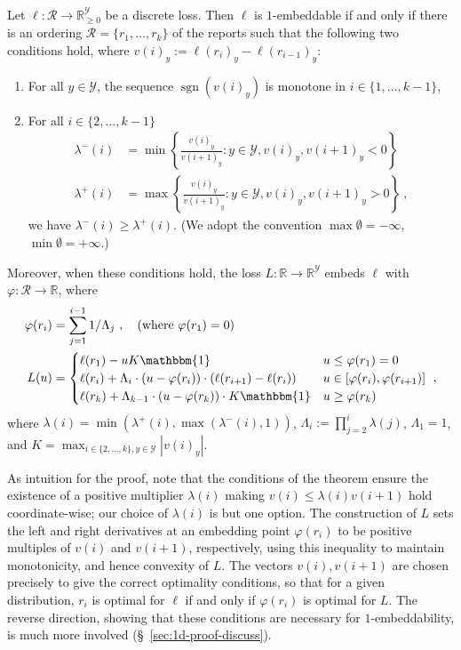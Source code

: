 \documentclass[anon]{colt2020} %
\newcommand{\reals}{\mathbb{R}}
\newcommand{\nonnegreals}{\reals_{\geq 0}}%
\newcommand{\R}{\mathcal{R}}
\newcommand{\Y}{\mathcal{Y}}
\newcommand{\ones}{\mathbbm{1}}
\DeclareMathOperator*{\sgn}{sgn}
\begin{document}
\begin{theorem} \label{thm:construct-1d-loss}
  Let $\ell: \R \to \nonnegreals^{\Y}$ be a discrete loss.
  Then $\ell$ is $1$-embeddable if and only if there is an ordering $\R = \{r_1,\ldots,r_k\}$ of the reports such that the following two conditions hold, where $v(i)_y := \ell(r_i)_y - \ell(r_{i-1})_y$:
  \begin{enumerate}
  \item For all $y\in\Y$, the sequence $\sgn(v(i)_y)$ is monotone in
    $i\in\{1,\ldots,k-1\}$,
  \item For all $i\in\{2,\ldots,k-1\}$
    \begin{align*}
      \lambda^-(i) &= \min \left\{\frac{v(i)_y}{v({i+1})_y} : y\in\Y, v(i)_y, v({i+1})_y < 0\right\}
      \\
      \lambda^+(i) &= \max \left\{\frac{v(i)_y}{v({i+1})_y} : y\in\Y, v(i)_y, v({i+1})_y > 0\right\}~,
    \end{align*}
    we have $\lambda^-(i) \geq \lambda^+(i)$.
    (We adopt the convention $\max\emptyset = -\infty$, $\min\emptyset = +\infty$.)
  \end{enumerate}

  Moreover, when these conditions hold, the loss $L:\reals\to\reals^\Y$ embeds $\ell$ with $\varphi:\R\to\reals$,
  where
  \begin{align*}
    \varphi(r_i) &= \sum_{j=1}^{i-1} 1/\Lambda_j~, \quad \text{(where $\varphi(r_1)=0$)}
    \\
    L(u) &= \begin{cases}
      \ell(r_1) - u K \ones & u \leq \varphi(r_1) = 0 \\
      \ell(r_i) + \Lambda_i \cdot (u - \varphi(r_i)) \cdot  (\ell(r_{i+1})-\ell(r_i)) & u \in [\varphi(r_i),\varphi(r_{i+1})] \\
      \ell(r_k) + \Lambda_{k-1} \cdot (u - \varphi(r_k))\cdot K \ones & u \geq \varphi(r_k)
    \end{cases}~,
  \end{align*}
  where $\lambda(i) = \min(\lambda^+(i),\max(\lambda^-(i),1))$, $\Lambda_i := \prod_{j=2}^i \lambda(j)$, $\Lambda_1=1$, and $K = \max_{i\in\{2,\ldots,k\},y\in\Y} |v(i)_y|$.
\end{theorem}
As intuition for the proof, note that the conditions of the theorem ensure the existence of a positive multiplier $\lambda(i)$ making $v(i) \leq \lambda(i) v(i+1)$ hold coordinate-wise; our choice of $\lambda(i)$ is but one option.
The construction of $L$ sets the left and right derivatives at an embedding point $\varphi(r_i)$ to be positive multiples of $v(i)$ and $v(i+1)$, respectively, using this inequality to maintain monotonicity, and hence convexity of $L$.
The vectors $v(i),v(i+1)$ are chosen precisely to give the correct optimality conditions, so that for a given distribution, $r_i$ is optimal for $\ell$ if and only if $\varphi(r_i)$ is optimal for $L$.
The reverse direction, showing that these conditions are necessary for $1$-embeddability, is much more involved (\S~\ref{sec:1d-proof-discuss}).
\end{document}
